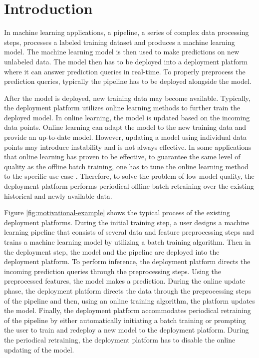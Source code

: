 \section{Introduction} \label{introduction}
In machine learning applications, a pipeline, a series of complex data processing steps, processes a labeled training dataset and produces a machine learning model.
The machine learning model is then used to make predictions on new unlabeled data.
The model then has to be deployed into a deployment platform where it can answer prediction queries in real-time.
To properly preprocess the prediction queries, typically the pipeline has to be deployed alongside the model.

After the model is deployed, new training data may become available.
Typically, the deployment platform utilizes online learning methods to further train the deployed model.
In online learning, the model is updated based on the incoming data points.
Online learning can adapt the model to the new training data and provide an up-to-date model.
However, updating a model using individual data points may introduce instability and is not always effective.
In some applications that online learning has proven to be effective, to guarantee the same level of quality as the offline batch training, one has to tune the online learning method to the specific use case \cite{ma2009identifying, macmahan2013}.
Therefore, to solve the problem of low model quality, the deployment platform performs periodical offline batch retraining over the existing historical and newly available data.

Figure \ref{fig:motivational-example} shows the typical process of the existing deployment platforms.
During the initial training step, a user designs a machine learning pipeline that consists of several data and feature preprocessing steps and trains a machine learning model by utilizing a batch training algorithm.
Then in the deployment step, the model and the pipeline are deployed into the deployment platform.
To perform inference, the deployment platform directs the incoming prediction queries through the preprocessing steps.
Using the preprocessed features, the model makes a prediction.
During the online update phase, the deployment platform directs the data through the preprocessing steps of the pipeline and then, using an online training algorithm, the platform updates the model.
Finally, the deployment platform accommodates periodical retraining of the pipeline by either automatically initiating a batch training or prompting the user to train and redeploy a new model to the deployment platform.
During the periodical retraining, the deployment platform has to disable the online updating of the model.

